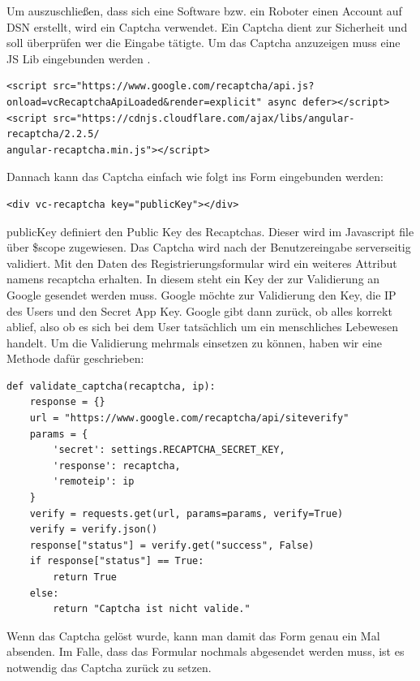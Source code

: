 Um auszuschließen, dass sich eine Software bzw. ein Roboter einen Account auf DSN erstellt, wird ein Captcha verwendet. Ein Captcha dient zur Sicherheit und soll überprüfen wer die Eingabe tätigte.
Um das Captcha anzuzeigen muss eine JS Lib eingebunden werden \cite{CAPTCHA}.
\begin{lstlisting}[caption={Einbindung der JS-Library Recaptcha}]
<script src="https://www.google.com/recaptcha/api.js?
onload=vcRecaptchaApiLoaded&render=explicit" async defer></script>
<script src="https://cdnjs.cloudflare.com/ajax/libs/angular-recaptcha/2.2.5/
angular-recaptcha.min.js"></script>
\end{lstlisting}

Dannach kann das Captcha einfach wie folgt ins Form eingebunden werden:
\begin{lstlisting}
<div vc-recaptcha key="publicKey"></div>
\end{lstlisting}

publicKey definiert den Public Key des Recaptchas. Dieser wird im Javascript file über \$scope zugewiesen.
Das Captcha wird nach der Benutzereingabe serverseitig validiert. Mit den Daten des Registrierungsformular wird ein weiteres Attribut namens recaptcha erhalten. In diesem steht ein Key der zur Validierung an Google gesendet werden muss. Google möchte zur Validierung den Key, die IP des Users und den Secret App Key. Google gibt dann zurück, ob alles korrekt ablief, also ob es sich bei dem User tatsächlich um ein menschliches Lebewesen handelt. Um die Validierung mehrmals einsetzen zu können, haben wir eine Methode dafür geschrieben:

\begin{lstlisting}
def validate_captcha(recaptcha, ip):
    response = {}
    url = "https://www.google.com/recaptcha/api/siteverify"
    params = {
        'secret': settings.RECAPTCHA_SECRET_KEY,
        'response': recaptcha,
        'remoteip': ip
    }
    verify = requests.get(url, params=params, verify=True)
    verify = verify.json()
    response["status"] = verify.get("success", False)
    if response["status"] == True:
        return True
    else:
        return "Captcha ist nicht valide." 
\end{lstlisting}


Wenn das Captcha gelöst wurde, kann man damit das Form genau ein Mal absenden. Im Falle, dass das Formular nochmals abgesendet werden muss, ist es notwendig das Captcha zurück zu setzen.

